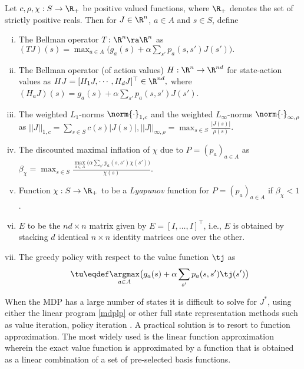 \begin{definition}
Let $c,\rho,\chi:S \to \R_+$ be positive valued functions, where $\R_+$ denotes the set of strictly positive reals. Then for $J\in \R^n$, $a\in A$ and $s\in S$, 
define
\begin{enumerate}[(i)]
\item The Bellman operator $T\colon \R^n \ra \R^n$ as $(TJ)(s)=\max_{a \in A}\big(g_a(s)+\alpha \sum_{s'} p_a(s,s')J(s')\big).
$
\item \label{bellactval} The Bellman operator (of action values) $H: \R^n \to \R^{nd}$ for state-action values as $HJ=[ H_1 J,\cdots,H_d J]^\top\in \R^{nd},$ where $(H_a J)(s)= g_a(s)+\alpha \sum_{s'}p_a(s,s') J(s')$.
\item The weighted $L_1$-norms $\norm{\cdot}_{1,c}$ 
and 
the weighted $L_\infty$-norms  $\norm{\cdot}_{\infty,\rho}$ as $
||J||_{1,c}=\sum_{s \in S} c(s)|J(s)|, 
||J||_{\infty,\rho}=\max_{s \in S} \frac{|J(s)|}{\rho(s)}$.
\item The discounted maximal inflation of $\chi$ due to $P = (p_a)_{a\in A}$ as $\beta_{\chi}=\max_{s \in S} \frac{\underset{a \in A}{\max}\big(\alpha\sum_{s'}p_a(s,s')\chi(s')\big)}{\chi(s)}$.
\item Function $\chi:S\to\R_+$ to be a \emph{Lyapunov} function for $P = (p_a)_{a\in A}$ if $\beta_{\chi}<1$.
\item $E$ to be the $nd\times n$ matrix given by $E=[I,\ldots,I]^\top$, i.e., $E$ is obtained by stacking $d$ identical $n\times n$ identity matrices one over the other.
\item The greedy policy with respect to the value function $\tj$ as \begin{align*}\tu\eqdef\underset{a\in A}{\argmax}\big(g_a(s)+\alpha \sum_{s'}p_a(s,s')\tj(s')\big)\end{align*}
\end{enumerate}
\end{definition}
When the MDP has a large number of states it is difficult to solve for $J^*$, using either the linear program \eqref{mdplp} or other full state representation methods such as value iteration, policy iteration \cite{BertB}. A practical solution is to resort to function approximation. The most widely used is the linear function approximation wherein the exact value function is approximated by a function that is obtained as a linear combination of a set of pre-selected basis functions.
